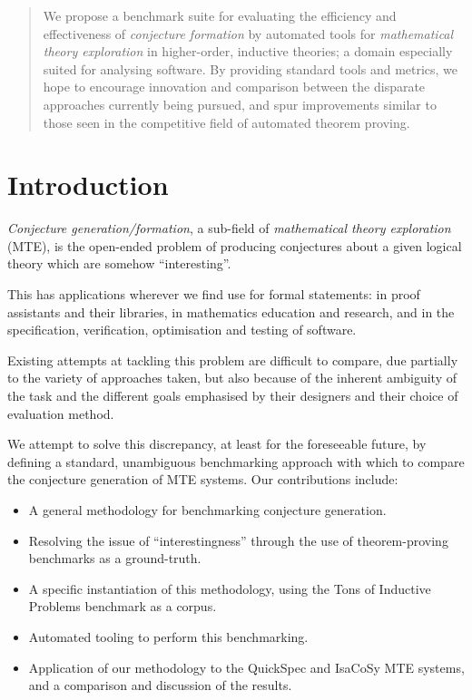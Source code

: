 \begin{abstract}
  We propose a benchmark suite for evaluating the efficiency and effectiveness
  of \emph{conjecture formation} by automated tools for \emph{mathematical
    theory exploration} in higher-order, inductive theories; a domain especially
  suited for analysing software. By providing standard tools and metrics, we
  hope to encourage innovation and comparison between the disparate approaches
  currently being pursued, and spur improvements similar to those seen in the
  competitive field of automated theorem proving.
\end{abstract}

\section{Introduction}
\label{intro}


\emph{Conjecture generation/formation}, a sub-field of \emph{mathematical theory
  exploration} (MTE), is the open-ended problem of producing conjectures about a
given logical theory which are somehow ``interesting''.

This has applications wherever we find use for formal statements: in proof
assistants and their libraries, in mathematics education and research, and in
the specification, verification, optimisation and testing of software.

Existing attempts at tackling this problem are difficult to compare, due
partially to the variety of approaches taken, but also because of the inherent
ambiguity of the task and the different goals emphasised by their designers and
their choice of evaluation method.

We attempt to solve this discrepancy, at least for the foreseeable future, by
defining a standard, unambiguous benchmarking approach with which to compare
the conjecture generation of MTE systems. Our contributions include:

\begin{itemize}
\item A general methodology for benchmarking conjecture generation.
\item Resolving the issue of ``interestingness'' through the use of
  theorem-proving benchmarks as a ground-truth.
\item A specific instantiation of this methodology, using the Tons of Inductive
  Problems benchmark as a corpus.
\item Automated tooling to perform this benchmarking.
\item Application of our methodology to the QuickSpec and IsaCoSy MTE systems,
  and a comparison and discussion of the results.
\end{itemize}

